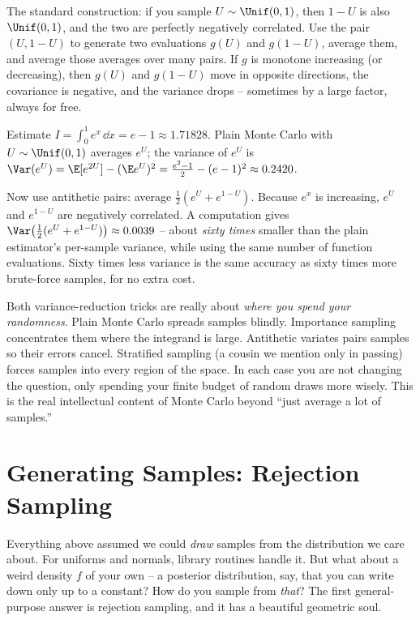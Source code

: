 The standard construction: if you sample $U \sim \Unif(0,1)$, then $1-U$ is also
$\Unif(0,1)$, and the two are perfectly negatively correlated. Use the pair
$(U, 1-U)$ to generate two evaluations $g(U)$ and $g(1-U)$, average them, and
average those averages over many pairs. If $g$ is monotone increasing (or
decreasing), then $g(U)$ and $g(1-U)$ move in opposite directions, the covariance
is negative, and the variance drops -- sometimes by a large factor, always for
free.

\begin{example}
\label{ch35:ex-antithetic}
Estimate $I = \int_0^1 e^x\,\dd x = e - 1 \approx 1.71828$. Plain Monte Carlo with
$U\sim\Unif(0,1)$ averages $e^U$; the variance of $e^U$ is
$\Var(e^U) = \E[e^{2U}] - (\E e^U)^2 = \frac{e^2-1}{2} - (e-1)^2 \approx 0.2420$.

Now use antithetic pairs: average $\frac12(e^U + e^{1-U})$. Because $e^x$ is
increasing, $e^U$ and $e^{1-U}$ are negatively correlated. A computation gives
$\Var\bigl(\tfrac12(e^U+e^{1-U})\bigr) \approx 0.0039$ -- about \emph{sixty times}
smaller than the plain estimator's per-sample variance, while using the same
number of function evaluations. Sixty times less variance is the same accuracy
as sixty times more brute-force samples, for no extra cost.
\end{example}

\begin{happeningbox}
Both variance-reduction tricks are really about \emph{where you spend your
randomness}. Plain Monte Carlo spreads samples blindly. Importance sampling
concentrates them where the integrand is large. Antithetic variates pairs samples
so their errors cancel. Stratified sampling (a cousin we mention only in passing)
forces samples into every region of the space. In each case you are not changing
the question, only spending your finite budget of random draws more wisely. This
is the real intellectual content of Monte Carlo beyond ``just average a lot of
samples.''
\end{happeningbox}

\section{Generating Samples: Rejection Sampling}
\label{ch35:rejection}

Everything above assumed we could \emph{draw} samples from the distribution we
care about. For uniforms and normals, library routines handle it. But what about
a weird density $f$ of your own -- a posterior distribution, say, that you can
write down only up to a constant? How do you sample from \emph{that}? The first
general-purpose answer is rejection sampling, and it has a beautiful geometric
soul.

